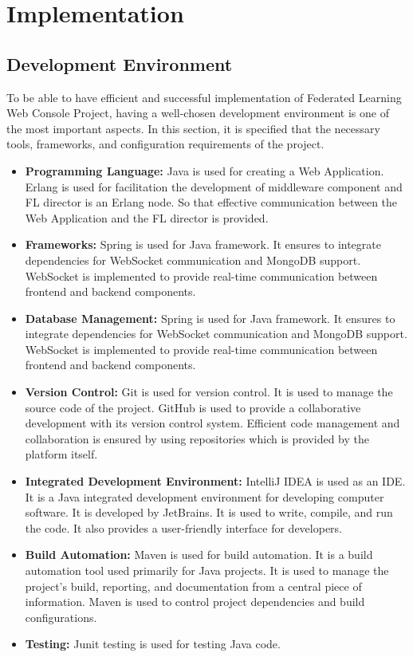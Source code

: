 \chapter{Implementation}

\section{Development Environment}

To be able to have efficient and successful implementation of Federated Learning Web Console Project, having a well-chosen development environment is one of the
most important aspects. In this section, it is specified that the necessary tools, frameworks, and configuration requirements of the project. \\
\begin{itemize}
    \item \textbf{Programming Language:} Java is used for creating a Web Application. Erlang is used for facilitation the development of middleware component and FL director is an Erlang node.
    So that effective communication between the Web Application and the FL director is provided.
    \item \textbf{Frameworks:}  Spring is used for Java framework. It ensures to integrate dependencies for WebSocket communication and MongoDB support.
    WebSocket is implemented to provide real-time communication between frontend and backend components.
    \item \textbf{Database Management:} Spring is used for Java framework. It ensures to integrate dependencies for WebSocket communication and MongoDB support.
    WebSocket is implemented to provide real-time communication between frontend and backend components.
    \item \textbf{Version Control:} Git is used for version control. It is used to manage the source code of the project. GitHub is used to provide a collaborative development with its version control system. Efficient code management and collaboration is ensured by using repositories which is provided by the platform itself.
    \item \textbf{Integrated Development Environment:} IntelliJ IDEA is used as an IDE. It is a Java integrated development environment for developing computer software. It is developed by JetBrains. It is used to write, compile, and run the code. It also provides a user-friendly interface for developers.
    \item \textbf{Build Automation:} Maven is used for build automation. It is a build automation tool used primarily for Java projects. It is used to manage the project's build, reporting, and documentation from a central piece of information. Maven is used to control project dependencies and build configurations.
    \item \textbf{Testing: } Junit testing is used for testing Java code.
\end{itemize}


